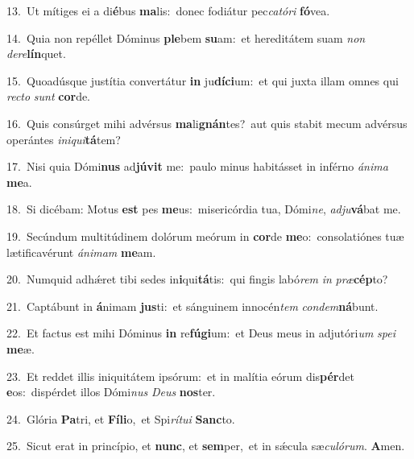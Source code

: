 {\numbfont\textcolor{\numbcolor}{13.}}~Ut mítiges ei a di\-\textbf{é}\-bus \textbf{ma}\-lis:~\star donec fodiátur pec\-\textit{ca}\-\textit{tó}\textit{ri} \textbf{fó}\-vea.\par
{\numbfont\textcolor{\numbcolor}{14.}}~Quia non repéllet Dóminus \textbf{ple}\-bem \textbf{su}\-am:~\star et hereditátem suam \textit{non} \textit{de}\-\textit{re}\textbf{lín}quet.\par
{\numbfont\textcolor{\numbcolor}{15.}}~Quoadúsque justítia convertátur \textbf{in} ju\-\textbf{dí}\-\textbf{ci}um:~\star et qui juxta illam omnes qui \textit{rec}\-\textit{to} \textit{sunt} \textbf{cor}\-de.\par
{\numbfont\textcolor{\numbcolor}{16.}}~Quis consúrget mihi advérsus \textbf{ma}\-li\-\textbf{gnán}\-tes?~\star aut quis stabit mecum advérsus operántes \textit{in}\-\textit{i}\textit{qui}\textbf{tá}tem?\par
{\numbfont\textcolor{\numbcolor}{17.}}~Nisi quia Dómi\textbf{nus} ad\-\textbf{jú}\-\textbf{vit} me:~\star paulo minus habitásset in inférno \textit{á}\-\textit{ni}\textit{ma} \textbf{me}\-a.\par
{\numbfont\textcolor{\numbcolor}{18.}}~Si dicébam: Motus \textbf{est} pes \textbf{me}\-us:~\star misericórdia tua, Dómi\-\textit{ne}\-, \textit{ad}\-\textit{ju}\textbf{vá}bat me.\par
{\numbfont\textcolor{\numbcolor}{19.}}~Secúndum multitúdinem dolórum meórum in \textbf{cor}\-de \textbf{me}\-o:~\star consolatiónes tuæ lætificavérunt \textit{á}\-\textit{ni}\textit{mam} \textbf{me}\-am.\par
{\numbfont\textcolor{\numbcolor}{20.}}~Numquid adhǽret tibi sedes in\-\textbf{i}\-qui\-\textbf{tá}\-tis:~\star qui fingis labó\textit{rem} \textit{in} \textit{præ}\-\textbf{cép}to?\par
{\numbfont\textcolor{\numbcolor}{21.}}~Captábunt in \textbf{á}\-nimam \textbf{jus}\-ti:~\star et sánguinem innocén\textit{tem} \textit{con}\-\textit{dem}\textbf{ná}bunt.\par
{\numbfont\textcolor{\numbcolor}{22.}}~Et factus est mihi Dóminus \textbf{in} re\-\textbf{fú}\-\textbf{gi}um:~\star et Deus meus in adjutóri\textit{um} \textit{spe}\-\textit{i} \textbf{me}\-æ.\par
{\numbfont\textcolor{\numbcolor}{23.}}~Et reddet illis iniquitátem ipsórum:~\dagger et in malítia eórum dis\-\textbf{pér}\-det \textbf{e}\-os:~\star dispérdet illos Dómi\textit{nus} \textit{De}\-\textit{us} \textbf{nos}\-ter.\par
{\numbfont\textcolor{\numbcolor}{24.}}~Glória \textbf{Pa}\-tri, et \textbf{Fí}\-\textbf{li}o,~\star et Spi\-\textit{rí}\-\textit{tu}\textit{i} \textbf{Sanc}\-to.\par
{\numbfont\textcolor{\numbcolor}{25.}}~Sicut erat in princípio, et \textbf{nunc}\-, et \textbf{sem}\-per,~\star et in sǽcula sæ\-\textit{cu}\-\textit{ló}\textit{rum}. \textbf{A}\-men.\par
